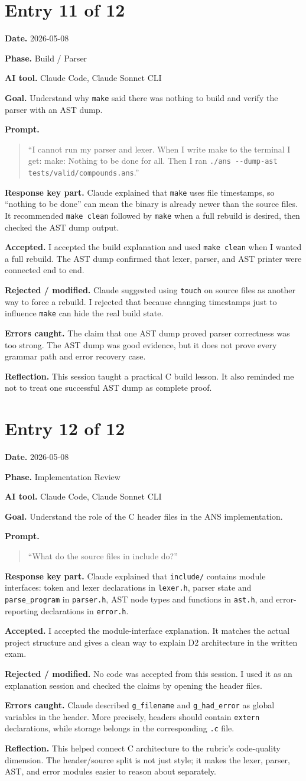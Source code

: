 \documentclass[11pt,a4paper]{article}
\newcommand{\code}[1]{\texttt{#1}}
\newcommand{\field}[2]{\textbf{#1.} #2\par}
\newcommand{\prompt}[1]{%
  \textbf{Prompt.}
  \begin{quote}\small #1\end{quote}
}
\begin{document}
\section{Entry 11 of 12}
\field{Date}{2026-05-08}
\field{Phase}{Build / Parser}
\field{AI tool}{Claude Code, Claude Sonnet CLI}
\field{Goal}{Understand why \code{make} said there was nothing to build and verify the parser with an AST dump.}
\prompt{``I cannot run my parser and lexer. When I write make to the terminal I get: make: Nothing to be done for all. Then I ran \code{./ans -{}-dump-ast tests/valid/compounds.ans}.''}
\field{Response key part}{Claude explained that \code{make} uses file timestamps, so ``nothing to be done'' can mean the binary is already newer than the source files. It recommended \code{make clean} followed by \code{make} when a full rebuild is desired, then checked the AST dump output.}
\field{Accepted}{I accepted the build explanation and used \code{make clean} when I wanted a full rebuild. The AST dump confirmed that lexer, parser, and AST printer were connected end to end.}
\field{Rejected / modified}{Claude suggested using \code{touch} on source files as another way to force a rebuild. I rejected that because changing timestamps just to influence \code{make} can hide the real build state.}
\field{Errors caught}{The claim that one AST dump proved parser correctness was too strong. The AST dump was good evidence, but it does not prove every grammar path and error recovery case.}
\field{Reflection}{This session taught a practical C build lesson. It also reminded me not to treat one successful AST dump as complete proof.}

\section{Entry 12 of 12}
\field{Date}{2026-05-08}
\field{Phase}{Implementation Review}
\field{AI tool}{Claude Code, Claude Sonnet CLI}
\field{Goal}{Understand the role of the C header files in the ANS implementation.}
\prompt{``What do the source files in include do?''}
\field{Response key part}{Claude explained that \code{include/} contains module interfaces: token and lexer declarations in \code{lexer.h}, parser state and \code{parse\_program} in \code{parser.h}, AST node types and functions in \code{ast.h}, and error-reporting declarations in \code{error.h}.}
\field{Accepted}{I accepted the module-interface explanation. It matches the actual project structure and gives a clean way to explain D2 architecture in the written exam.}
\field{Rejected / modified}{No code was accepted from this session. I used it as an explanation session and checked the claims by opening the header files.}
\field{Errors caught}{Claude described \code{g\_filename} and \code{g\_had\_error} as global variables in the header. More precisely, headers should contain \code{extern} declarations, while storage belongs in the corresponding \code{.c} file.}
\field{Reflection}{This helped connect C architecture to the rubric's code-quality dimension. The header/source split is not just style; it makes the lexer, parser, AST, and error modules easier to reason about separately.}
\end{document}
